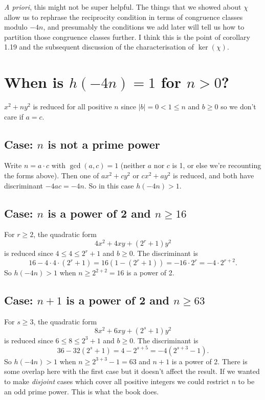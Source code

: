 \emph{A priori}, this might not be super helpful. The things that we showed about $\chi$ allow us to rephrase the reciprocity condition in terms of congruence classes modulo $-4n$, and presumably the conditions we add later will tell us how to partition those congruence classes further. I think this is the point of corollary 1.19 and the subsequent discussion of the characterisation of $\ker(\chi)$.

\section{When is $h(-4n)=1$ for $n>0$?}

$x^2+ny^2$ is reduced for all positive $n$ since $|b|=0< 1\leq n$ and $b\geq 0$ so we don't care if $a=c$.

\subsection{Case: $n$ is not a prime power}

Write $n=a\cdot c$ with $\gcd(a,c)=1$ (neither $a$ nor $c$ is 1, or else we're recounting the forms above). Then one of $ax^2+cy^2$ or $cx^2+ay^2$ is reduced, and both have discriminant $-4ac=-4n$. So in this case $h(-4n)>1$.

\subsection{Case: $n$ is a power of 2 and $n\geq 16$}

For $r\geq 2$, the quadratic form
\[4x^2+4xy+(2^r+1)y^2\]
is reduced since $4\leq 4\leq 2^r+1$ and $b\geq 0$. The discriminant is
\[16-4\cdot 4\cdot (2^r+1)=16(1-(2^r+1))=-16\cdot 2^r=-4\cdot 2^{r+2}.\]
So $h(-4n)>1$ when $n\geq 2^{2+2}=16$ is a power of 2.

\subsection{Case: $n+1$ is a power of 2 and $n\geq 63$}

For $s\geq 3$, the quadratic form
\[8x^2+6xy+(2^s+1)y^2\]
is reduced since $6\leq 8\leq 2^3+1$ and $b\geq 0$. The discriminant is
\[36-32(2^s+1)=4-2^{s+5}=-4(2^{s+3}-1).\]
So $h(-4n)>1$ when $n\geq 2^{3+3}-1=63$ and $n+1$ is a power of 2. There is some overlap here with the first case but it doesn't affect the result. If we wanted to make \emph{disjoint} cases which cover all positive integers we could restrict $n$ to be an odd prime power. This is what the book does.

